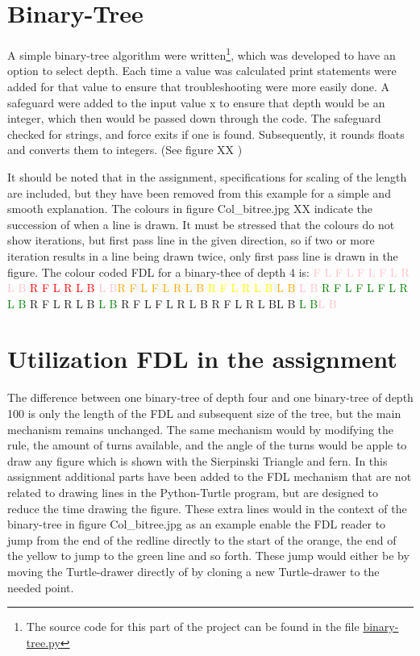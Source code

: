 \documentclass[titlepage]{article}
\newcommand{\pink}{\textcolor{pink}}
\newcommand{\red}{\textcolor{red}}
\newcommand{\orange}{\textcolor{orange}}
\newcommand{\yellow}{\textcolor{yellow}}
\newcommand{\green}{\textcolor{green}}
\newcommand{\lgreen}{\textcolor{lgreen}}
\newcommand{\dblue}{\textcolor{dblue}}
\newcommand{\lblue}{\textcolor{lblue}}
\begin{document}
\section{Binary-Tree}
A simple binary-tree algorithm were written\footnote{The source code for this part of the project can be found in the file \href{https://github.com/ErikAndersen81/DM550-FractalProject/blob/master/Working_binary_tree.py}{binary-tree.py}}, which was developed to have an option to select depth. Each time a value was calculated print statements were added for that value to ensure that troubleshooting were more easily done.  A safeguard were added to the input value x to ensure that depth would be an integer, which then would be passed down through the code. The safeguard checked for strings, and force exits if one is found. Subsequently, it rounds floats and converts them to integers. (See figure XX )

It should be noted that in the assignment, specifications for scaling of the length are included, but they have been removed from this example for a simple and smooth explanation. The colours in figure Col_bitree.jpg XX indicate the succession of when a line is drawn. It must be stressed that the colours do not show iterations, but first pass line in the given direction, so if two or more iteration results in a line being drawn twice, only first pass line is drawn in the figure. 
The colour coded FDL for a binary-thee of depth 4 is:
\pink{F L F L F L F L R L B} \red{R F L R L B} \pink{L B}\orange{R F L F L R L B}\yellow{ R F L R L B}\orange{ L B} \pink{L B}\green{ R F L F L F L R L B}\lgreen{ R F L R L B}\green{ L B}\dblue{ R F L F L R L B}\lblue{ R F L R L B}\dblue{L B}\green{ L B}\pink{L B}

\section{Utilization FDL in the assignment}
The difference between one binary-tree of depth four and one binary-tree of depth 100 is only the length of the FDL and subsequent size of the tree, but the main mechanism remains unchanged.  The same mechanism would by modifying the rule, the amount of turns available, and the angle of the turns would be apple to draw any figure which is shown with the Sierpinski Triangle and fern.  In this assignment additional parts have been added to the FDL mechanism that are not related to drawing lines in the Python-Turtle program, but are designed to reduce the time drawing the figure. These extra lines would in the context of the binary-tree in figure Col_bitree.jpg  as an example enable the FDL reader to jump from the end of the redline directly to the start of the orange, the end of the yellow to jump to the green line and so forth. These jump would either be by moving the Turtle-drawer directly of by cloning a new Turtle-drawer to the needed point. 
\end{document}
